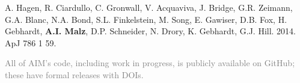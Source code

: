 \begin{etaremune}
\item A. Hagen, R. Ciardullo, C. Gronwall, V. Acquaviva, J. Bridge, G.R. Zeimann, G.A. Blanc, N.A. Bond, S.L. Finkelstein, M. Song, E. Gawiser, D.B. Fox, H. Gebhardt, {\bf A.I. Malz}, D.P. Schneider, N. Drory, K. Gebhardt, G.J. Hill. 2014. ApJ 786 1 59. 
  
\end{etaremune}



	{\fontsize{9pt}{5pt}\selectfont\textcolor{grey}{All of AIM's code, including work in progress, is publicly available on GitHub; these have formal releases with DOIs.}\par}
